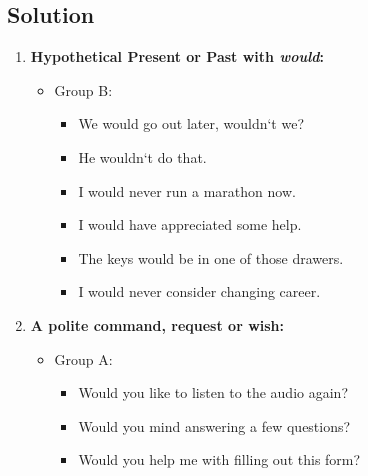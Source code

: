\subsection*{Solution}
\begin{enumerate}
      \item \textbf{Hypothetical Present or Past with \textit{would}:}
            \begin{itemize}
                  \item Group B:
                        \begin{itemize}
                              \item We would go out later, wouldn`t we?
                              \item He wouldn`t do that.
                              \item I would never run a marathon now.
                              \item I would have appreciated some help.
                              \item The keys would be in one of those drawers.
                              \item I would never consider changing career.
                        \end{itemize}
            \end{itemize}

      \item \textbf{A polite command, request or wish:}
            \begin{itemize}
                  \item Group A:
                        \begin{itemize}
                              \item Would you like to listen to the audio again?
                              \item Would you mind answering a few questions?
                              \item Would you help me with filling out this form?
                        \end{itemize}
            \end{itemize}


\end{enumerate}
